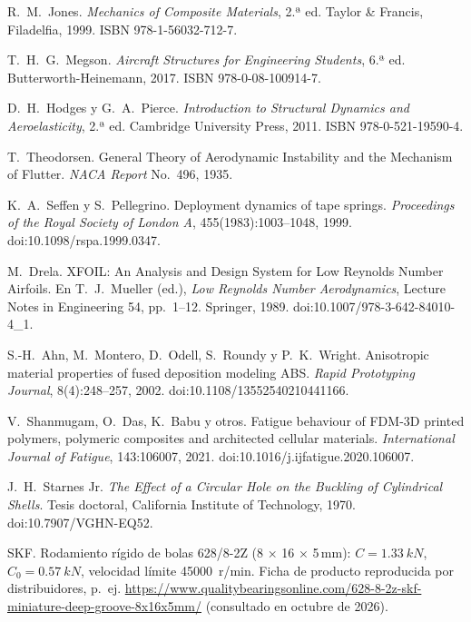  R.~M.~Jones. \emph{Mechanics of Composite Materials},
  2.ª ed. Taylor \& Francis, Filadelfia, 1999. ISBN 978-1-56032-712-7.

 T.~H.~G.~Megson. \emph{Aircraft Structures for
  Engineering Students}, 6.ª ed. Butterworth-Heinemann, 2017. ISBN 978-0-08-100914-7.

 D.~H.~Hodges y G.~A.~Pierce. \emph{Introduction to
  Structural Dynamics and Aeroelasticity}, 2.ª ed. Cambridge University Press, 2011.
  ISBN 978-0-521-19590-4.

 T.~Theodorsen. General Theory of Aerodynamic
  Instability and the Mechanism of Flutter. \emph{NACA Report} No.~496, 1935.

 K.~A.~Seffen y S.~Pellegrino. Deployment dynamics of
  tape springs. \emph{Proceedings of the Royal Society of London A}, 455(1983):1003--1048,
  1999. doi:10.1098/rspa.1999.0347.

 M.~Drela. XFOIL: An Analysis and Design System for Low
  Reynolds Number Airfoils. En T.~J.~Mueller (ed.), \emph{Low Reynolds Number
  Aerodynamics}, Lecture Notes in Engineering 54, pp.~1--12. Springer, 1989.
  doi:10.1007/978-3-642-84010-4\_1.

 S.-H.~Ahn, M.~Montero, D.~Odell, S.~Roundy y P.~K.~Wright.
  Anisotropic material properties of fused deposition modeling ABS. \emph{Rapid
  Prototyping Journal}, 8(4):248--257, 2002. doi:10.1108/13552540210441166.

 V.~Shanmugam, O.~Das, K.~Babu y otros. Fatigue
  behaviour of FDM-3D printed polymers, polymeric composites and architected cellular
  materials. \emph{International Journal of Fatigue}, 143:106007, 2021.
  doi:10.1016/j.ijfatigue.2020.106007.

 J.~H.~Starnes Jr. \emph{The Effect of a Circular Hole on
  the Buckling of Cylindrical Shells}. Tesis doctoral, California Institute of
  Technology, 1970. doi:10.7907/VGHN-EQ52.

 SKF. Rodamiento rígido de bolas 628/8-2Z (8 × 16 × 5\,mm):
  $C=\SI{1.33}{kN}$, $C_0=\SI{0.57}{kN}$, velocidad límite \SI{45000}{r/min}. Ficha de
  producto reproducida por distribuidores, p.~ej.
  \url{https://www.qualitybearingsonline.com/628-8-2z-skf-miniature-deep-groove-8x16x5mm/}
  (consultado en octubre de 2026).
